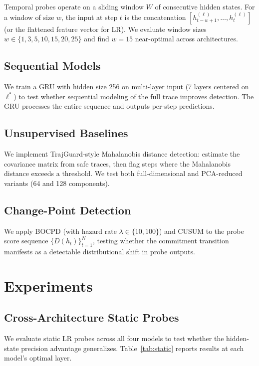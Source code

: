\documentclass[11pt,a4paper]{article}
\begin{document}
Temporal probes operate on a sliding window $W$ of consecutive hidden states. For a window of size $w$, the input at step $t$ is the concatenation $[h_{t-w+1}^{(\ell)}, \ldots, h_t^{(\ell)}]$ (or the flattened feature vector for LR). We evaluate window sizes $w \in \{1, 3, 5, 10, 15, 20, 25\}$ and find $w=15$ near-optimal across architectures.

\subsection{Sequential Models}

We train a GRU with hidden size 256 on multi-layer input (7 layers centered on $\ell^*$) to test whether sequential modeling of the full trace improves detection. The GRU processes the entire sequence and outputs per-step predictions.

\subsection{Unsupervised Baselines}

We implement TrajGuard-style Mahalanobis distance detection: estimate the covariance matrix from safe traces, then flag steps where the Mahalanobis distance exceeds a threshold. We test both full-dimensional and PCA-reduced variants (64 and 128 components).

\subsection{Change-Point Detection}

We apply BOCPD (with hazard rate $\lambda \in \{10, 100\}$) and CUSUM to the probe score sequence $\{D(h_t)\}_{t=1}^N$, testing whether the commitment transition manifests as a detectable distributional shift in probe outputs.

\section{Experiments}

\subsection{Cross-Architecture Static Probes}

We evaluate static LR probes across all four models to test whether the hidden-state precision advantage generalizes. Table~\ref{tab:static} reports results at each model's optimal layer.
\end{document}
